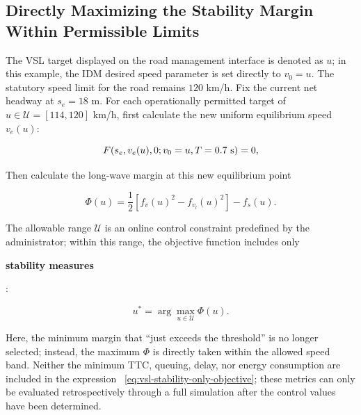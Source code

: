 \documentclass[11pt,a4paper,openany]{book}
\numberwithin{equation}{chapter}
\numberwithin{figure}{chapter}
\numberwithin{table}{chapter}
\begin{document}
\subsection{Directly Maximizing the Stability Margin Within Permissible Limits}










The VSL target displayed on the road management interface is denoted as $u$; in this example, the IDM desired speed parameter is set directly to $v_0=u$. The statutory speed limit for the road remains $120$ km/h. Fix the current net headway at $s_e=18$ m. For each operationally permitted target of $u\in\mathcal U=[114,120]$ km/h, first calculate the new uniform equilibrium speed $v_e(u)$:

\begin{equation}
F\!\left(s_e,v_e(u),0;v_0=u,T=0.7~{\rm s}\right)=0,
\label{eq:vsl-new-equilibrium}
\end{equation}

Then calculate the long-wave margin at this new equilibrium point

\begin{equation}
\Phi(u)=\frac12\left[f_v(u)^2-f_{v_l}(u)^2\right]-f_s(u).
\label{eq:vsl-phi}
\end{equation}

The allowable range $\mathcal U$ is an online control constraint predefined by the administrator; within this range, the objective function includes only




\textbf{stability measures}




:

\begin{equation}
u^*=\arg\max_{u\in\mathcal U}\Phi(u).
\label{eq:vsl-stability-only-objective}
\end{equation}

Here, the minimum margin that “just exceeds the threshold” is no longer selected; instead, the maximum $\Phi$ is directly taken within the allowed speed band. Neither the minimum TTC, queuing, delay, nor energy consumption are included in the expression ~\eqref{eq:vsl-stability-only-objective}; these metrics can only be evaluated retrospectively through a full simulation after the control values have been determined.
\end{document}
